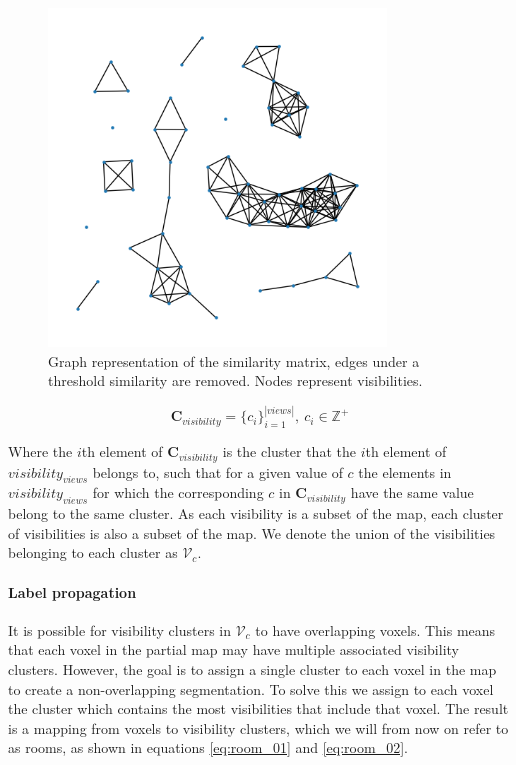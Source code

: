 \begin{figure}[h]
    \centering
    \includegraphics*[width=0.8\textwidth]{./fig/mutual_visibility_graph.png}
    \caption{Graph representation of the similarity matrix, edges under a threshold similarity are removed. Nodes represent visibilities.}
    \label{fig:similarity_graph}
\end{figure}

\begin{equation}
    \label{eq:c_visibility}
    \mathbf{C}_{visibility} = \{c_i\}_{i=1}^{|views|},\ c_i \in \mathbb{Z}^+
\end{equation}

Where the \(i\)th element of \(\mathbf{C}_{visibility}\) is the cluster that the \(i\)th element of \(visibility_{views}\) belongs to, such that for a given value of \(c\) the elements in \(visibility_{views}\) for which the corresponding \(c\) in \(\mathbf{C}_{visibility}\) have the same value belong to the same cluster. As each visibility is a subset of the map, each cluster of visibilities is also a subset of the map. We denote the union of the visibilities belonging to each cluster as \(\mathcal{V}_{c}\). 

\paragraph{Label propagation}
It is possible for visibility clusters in \(\mathcal{V}_{c}\) to have overlapping voxels. This means that each voxel in the partial map may have multiple associated visibility clusters. However, the goal is to assign a single cluster to each voxel in the map to create a non-overlapping segmentation. To solve this we assign to each voxel the cluster which contains the most visibilities that include that voxel. The result is a mapping from voxels to visibility clusters, which we will from now on refer to as rooms, as shown in equations \ref{eq:room_01} and \ref{eq:room_02}.

